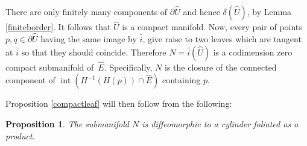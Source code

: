 \documentclass[JEP,XML,SOM,Unicode]{cedram}
\DeclareMathOperator{\inte}{int}
\newtheorem{proposition}[theorem]{Proposition}
\theoremstyle{definition}
\theoremstyle{remark}
\numberwithin{equation}{section}
\begin{document}
There are only finitely many components of $\partial\wideparen{U}$ and hence
$\delta(\wideparen{U})$, by Lemma \ref{finiteborder}. It follows that $\wideparen{U}$ is a compact manifold.
Now, every pair of points $p,q\in \partial \wideparen{U}$ having the same image by $\wideparen{i}$, give raise
to two leaves which are tangent at $\wideparen{i}$ so that they should coincide.
Therefore $N=\wideparen{i}(\wideparen{U})$ is a
codimension zero compact submanifold of~$\widehat{E}$.
Specifically, $N$ is the closure of the connected component of $\inte (H^{-1}(H(p))\cap \widehat{E})$ containing $p$.

Proposition \ref{compactleaf} will then follow from the following:

\begin{proposition}\label{cylinder}
The submanifold $N$ is diffeomorphic to a cylinder foliated as a product.
\end{proposition}
\end{document}
